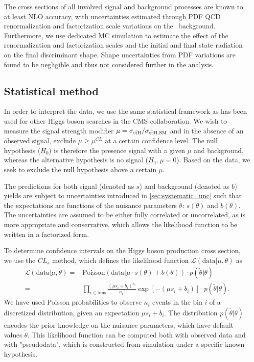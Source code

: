 The cross sections of all involved signal and background processes are known to at least NLO accuracy, with uncertainties estimated through PDF QCD renormalization and factorization scale variations on the \ttbar~background. Furthermore, we use dedicated MC simulation to estimate the effect of the renormalization and factorization scales and the initial and final state radiation on the final discriminant shape. Shape uncertainties from PDF variations are found to be negligible and thus not considered further in the analysis.

\subsection{Statistical method}
\label{sec:statistical_method}
In order to interpret the data, we use the same statistical framework as has been used for other Higgs boson searches in the CMS collaboration. We wish to measure the signal strength modifier $\mu = \sigma_{\mathrm{t} \bar{\mathrm{t}} \mathrm{H}}/\sigma_{\mathrm{t} \bar{\mathrm{t}} \mathrm{H},\mathrm{SM}}$ and in the absence of an observed signal, exclude $\mu \ge \mu^{CL}$ at a certain confidence level. The null hypothesis ($H_0$) is therefore the presence signal with a given $\mu$ and background, whereas the alternative hypothesis is no signal ($H_1, \mu = 0 $). Based on the data, we seek to exclude the null hypothesis above a certain $\mu$.

The predictions for both signal (denoted as $s$) and background (denoted as $b$) yields are subject to uncertainties introduced in \cref{sec:systematic_unc} such that the expectations are functions of the nuisance parameters $\theta$: $s(\theta)$ and $b(\theta)$. The uncertainties are assumed to be either fully correlated or uncorrelated, as is more appropriate and conservative, which allows the likelihood function to be written in a factorized form.

To determine confidence intervals on the Higgs boson production cross section, we use the $CL_s$ method, which defines the likelihood function $\mathcal{L}(\mathrm{data} | \mu, \theta)$ as
\begin{align}
\label{eq:likelihood}
\mathcal{L}(\mathrm{data} | \mu, \theta) =&  \mathrm{Poisson}(\mathrm{data} | \mu \cdot s(\theta) + b(\theta)) \cdot p(\tilde{\theta} | \theta)\\
=& \prod_{i\in \mathrm{bins}} \frac{(\mu s_i + b_i)^{n_i}}{n_i!} \exp{[-(\mu s_i + b_i)]} \cdot p(\tilde{\theta} | \theta).
\end{align}
We have used Poisson probabilities to observe $n_i$ events in the bin $i$ of a discretized distribution, given an expectation $\mu s_i + b_i$. The distribution $p(\tilde{\theta} | \theta)$ encodes the prior knowledge on the nuisance parameters, which have default values $\tilde{\theta}$. This likelihood function can be computed both with observed data and with "pseudodata", which is constructed from simulation under a specific known hypothesis.

